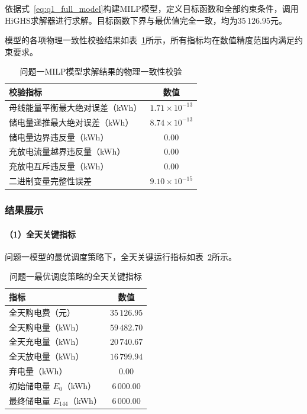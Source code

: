 \documentclass[12pt,a4paper]{ctexart}
\theoremstyle{definition}
\theoremstyle{plain}
\theoremstyle{remark}
\begin{document}
依据式~\eqref{eq:q1_full_model}构建MILP模型，定义目标函数和全部约束条件，调用HiGHS求解器进行求解。目标函数下界与最优值完全一致，均为$35\,126.95$元。

模型的各项物理一致性校验结果如表~\ref{tab:q1_validation}所示，所有指标均在数值精度范围内满足约束要求。

\begin{table}[H]
\centering
\caption{问题一MILP模型求解结果的物理一致性校验}
\label{tab:q1_validation}
\begin{tabular}{lc}
\toprule
\textbf{校验指标} & \textbf{数值} \\
\midrule
母线能量平衡最大绝对误差（kWh）  & $1.71 \times 10^{-13}$ \\
储电量递推最大绝对误差（kWh）    & $8.74 \times 10^{-13}$ \\
储电量边界违反量（kWh）          & $0.00$ \\
充放电流量越界违反量（kWh）      & $0.00$ \\
充放电互斥违反量（kWh）          & $0.00$ \\
二进制变量完整性误差             & $9.10 \times 10^{-15}$ \\
\bottomrule
\end{tabular}
\end{table}

\subsubsection{结果展示}

\paragraph{（1）全天关键指标}

问题一模型的最优调度策略下，全天关键运行指标如表~\ref{tab:q1_summary}所示。

\begin{table}[H]
\centering
\caption{问题一最优调度策略的全天关键指标}
\label{tab:q1_summary}
\begin{tabular}{lc}
\toprule
\textbf{指标} & \textbf{数值} \\
\midrule
全天购电费（元）             & $35\,126.95$ \\
全天购电量（kWh）            & $59\,482.70$ \\
全天充电量（kWh）            & $20\,740.67$ \\
全天放电量（kWh）            & $16\,799.94$ \\
弃电量（kWh）                & $0.00$ \\
初始储电量 $E_0$（kWh）      & $6\,000.00$ \\
最终储电量 $E_{144}$（kWh）  & $6\,000.00$ \\
\bottomrule
\end{tabular}
\end{table}
\end{document}
